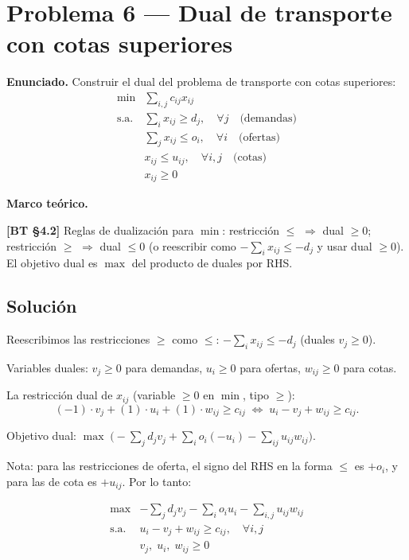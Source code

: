 \documentclass{article}
\newenvironment{marco}{\begin{mdframed}[linecolor=black!40,backgroundcolor=gray!5]\small\textbf{Marco teórico.}\par\smallskip}{\end{mdframed}\medskip}
\begin{document}
\section*{Problema 6 --- Dual de transporte con cotas superiores}

\textbf{Enunciado.} Construir el dual del problema de transporte con cotas superiores:
\[
\begin{array}{ll}
\min & \sum_{i,j} c_{ij} x_{ij} \\
\text{s.a.} & \sum_i x_{ij} \geq d_j, \quad \forall j \quad \text{(demandas)} \\
& \sum_j x_{ij} \leq o_i, \quad \forall i \quad \text{(ofertas)} \\
& x_{ij} \leq u_{ij}, \quad \forall i,j \quad \text{(cotas)} \\
& x_{ij} \geq 0
\end{array}
\]

\begin{marco}
\textbf{[BT §4.2]} Reglas de dualización para $\min$: restricción $\leq$ $\Rightarrow$ dual $\geq 0$; restricción $\geq$ $\Rightarrow$ dual $\leq 0$ (o reescribir como $-\sum_i x_{ij} \leq -d_j$ y usar dual $\geq 0$). El objetivo dual es $\max$ del producto de duales por RHS.
\end{marco}

\subsection*{Solución}

Reescribimos las restricciones $\geq$ como $\leq$: $-\sum_i x_{ij} \leq -d_j$ (duales $v_j \geq 0$).

Variables duales: $v_j \geq 0$ para demandas, $u_i \geq 0$ para ofertas, $w_{ij} \geq 0$ para cotas.

La restricción dual de $x_{ij}$ (variable $\geq 0$ en $\min$, tipo $\geq$):
\[
  (-1)\cdot v_j + (1)\cdot u_i + (1)\cdot w_{ij} \geq c_{ij} \;\Leftrightarrow\; u_i - v_j + w_{ij} \geq c_{ij}.
\]

Objetivo dual: $\max\; \bigl(-\sum_j d_j v_j + \sum_i o_i(-u_i) - \sum_{ij} u_{ij} w_{ij}\bigr)$.

Nota: para las restricciones de oferta, el signo del RHS en la forma $\leq$ es $+o_i$, y para las de cota es $+u_{ij}$. Por lo tanto:

\[
\boxed{
\begin{array}{ll}
\max & -\displaystyle\sum_j d_j v_j - \sum_i o_i u_i - \sum_{i,j} u_{ij} w_{ij} \\[6pt]
\text{s.a.} & u_i - v_j + w_{ij} \geq c_{ij}, \quad \forall i,j \\[2pt]
& v_j,\; u_i,\; w_{ij} \geq 0
\end{array}
}
\]
\end{document}
